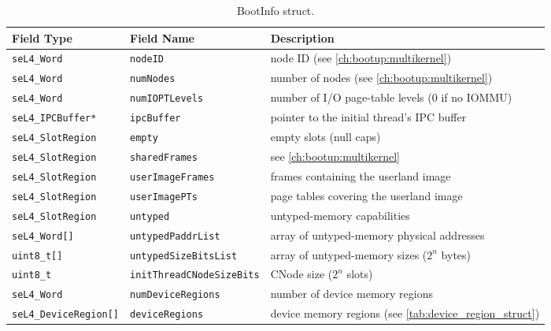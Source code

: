 \begin{table}[htb]
  \begin{center}
    \caption{BootInfo struct.}
    \label{tab:bootinfo_struct}
    \begin{tabularx}{\textwidth}{llX}
      \toprule
      Field Type & Field Name & Description \\
      \midrule
      \texttt{seL4\_Word}           & \texttt{nodeID}                  & node ID (see \autoref{ch:bootup:multikernel}) \\
      \texttt{seL4\_Word}           & \texttt{numNodes}                & number of nodes (see \autoref{ch:bootup:multikernel}) \\
      \texttt{seL4\_Word}           & \texttt{numIOPTLevels}           & number of I/O page-table levels (0 if no IOMMU) \\
      \texttt{seL4\_IPCBuffer*}     & \texttt{ipcBuffer}               & pointer to the initial thread's IPC buffer \\
      \texttt{seL4\_SlotRegion}     & \texttt{empty}                   & empty slots (null caps) \\
      \texttt{seL4\_SlotRegion}     & \texttt{sharedFrames}            & see \autoref{ch:bootup:multikernel} \\
      \texttt{seL4\_SlotRegion}     & \texttt{userImageFrames}         & frames containing the userland image \\
      \texttt{seL4\_SlotRegion}     & \texttt{userImagePTs}            & page tables covering the userland image \\
      \texttt{seL4\_SlotRegion}     & \texttt{untyped}                 & untyped-memory capabilities \\
      \texttt{seL4\_Word[]}         & \texttt{untypedPaddrList}        & array of untyped-memory physical addresses \\
      \texttt{uint8\_t[]}           & \texttt{untypedSizeBitsList}     & array of untyped-memory sizes ($2^n$ bytes) \\
      \texttt{uint8\_t}             & \texttt{initThreadCNodeSizeBits} & CNode size ($2^n$ slots) \\
      \texttt{seL4\_Word}           & \texttt{numDeviceRegions}        & number of device memory regions \\
      \texttt{seL4\_DeviceRegion[]} & \texttt{deviceRegions}           & device memory regions (see \autoref{tab:device_region_struct}) \\
      \bottomrule
    \end{tabularx}
  \end{center}
\end{table}

